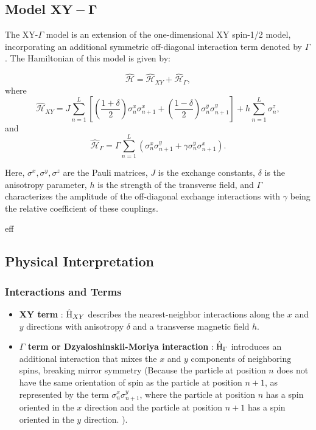 






\subsection{Model $\mathbf{XY-\Gamma}$}

The XY-$\Gamma$ model is an extension of the one-dimensional XY spin-1/2 model, 
incorporating an additional symmetric off-diagonal interaction term denoted by $\Gamma$. 
The Hamiltonian of this model is given by:

\begin{equation}
	\mathcal{\hat{H}} = \mathcal{\hat{H}}_{XY} + \mathcal{\hat{H}}_{\Gamma},
\end{equation}
where
\begin{equation}
	\mathcal{\hat{H}}_{XY} = J \sum_{n=1}^L \left[ \left( \frac{1 + \delta}{2} \right) \sigma^x_n \sigma^x_{n+1} + \left( \frac{1 - \delta}{2} \right) \sigma^y_n \sigma^y_{n+1} \right] + h \sum_{n=1}^L \sigma^z_n,
\end{equation}
and
\begin{equation}
	\mathcal{\hat{H}}_{\Gamma} = \Gamma \sum_{n=1}^L \left( \sigma^x_n \sigma^y_{n+1} + \gamma \sigma^y_n \sigma^x_{n+1} \right).
\end{equation}

Here, $\sigma^x, \sigma^y, \sigma^z$ are the Pauli matrices, $J$ is the exchange constants, 
$\delta$ is the anisotropy parameter, 
$h$ is the strength of the transverse field, and 
$\Gamma$ characterizes the amplitude of the off-diagonal exchange interactions with 
$\gamma$ being the relative coefficient of these couplings.

eff
\subsection{Physical Interpretation}

\subsubsection{Interactions and Terms}
\begin{itemize}
    \item \textbf{XY term} : $\operatorname{{\hat{H}}}_{XY}$ describes the nearest-neighbor interactions along the 
	$x$ and $y$ directions with anisotropy $\delta$ and a transverse magnetic field $h$.
	\item \textbf{$\Gamma$ term or Dzyaloshinskii-Moriya interaction} :
	 $\operatorname{{\hat{H}}}_{\Gamma}$ introduces an additional interaction 
	that mixes the $x$ and $y$ components of neighboring spins, breaking mirror symmetry (Because the particle at 
	position $n$ does not have the same orientation of spin as the particle at position $n+1$, 
	as represented by the term $\sigma^x_n \sigma^y_{n+1}$, where the particle at position $n$ has a spin oriented in the $x$ 
	direction and the particle at position $n+1$ has a spin oriented in the $y$ direction.
	).
\end{itemize}

